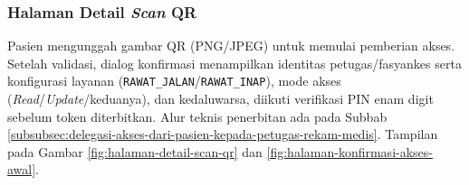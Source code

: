 \subsubsection{Halaman Detail \textit{Scan} QR}
\label{subsubsec:halaman-detail-scan-qr}

Pasien mengunggah gambar QR (PNG/JPEG) untuk memulai pemberian akses. Setelah validasi, dialog konfirmasi menampilkan identitas petugas/fasyankes serta konfigurasi layanan (\texttt{RAWAT\_JALAN}/\texttt{RAWAT\_INAP}), mode akses (\textit{Read}/\textit{Update}/keduanya), dan kedaluwarsa, diikuti verifikasi PIN enam digit sebelum token diterbitkan. Alur teknis penerbitan ada pada Subbab \ref{subsubsec:delegasi-akses-dari-pasien-kepada-petugas-rekam-medis}. Tampilan pada Gambar \ref{fig:halaman-detail-scan-qr} dan \ref{fig:halaman-konfirmasi-akses-awal}.
